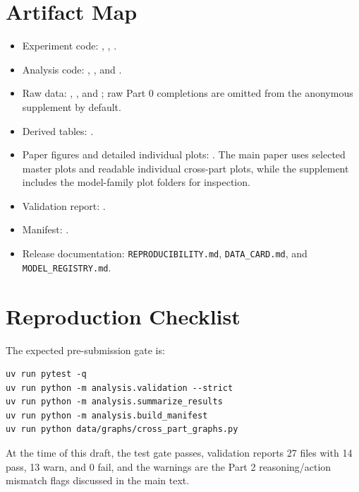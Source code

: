 \documentclass{article}
\begin{document}



\appendix

\section{Artifact Map}
\begin{itemize}
    \item Experiment code: , , .
    \item Analysis code: , , and .
    \item Raw data: , , and ; raw Part 0 completions are omitted from the anonymous supplement by default.
    \item Derived tables: .
    \item Paper figures and detailed individual plots: . The main paper uses selected master plots and readable individual cross-part plots, while the supplement includes the model-family plot folders for inspection.
    \item Validation report: .
    \item Manifest: .
    \item Release documentation: \texttt{REPRODUCIBILITY.md}, \texttt{DATA\_CARD.md}, and \texttt{MODEL\_REGISTRY.md}.
\end{itemize}

\section{Reproduction Checklist}
The expected pre-submission gate is:
\begin{verbatim}
uv run pytest -q
uv run python -m analysis.validation --strict
uv run python -m analysis.summarize_results
uv run python -m analysis.build_manifest
uv run python data/graphs/cross_part_graphs.py
\end{verbatim}
At the time of this draft, the test gate passes, validation reports 27 files with 14 pass, 13 warn, and 0 fail, and the warnings are the Part 2 reasoning/action mismatch flags discussed in the main text.
\end{document}
